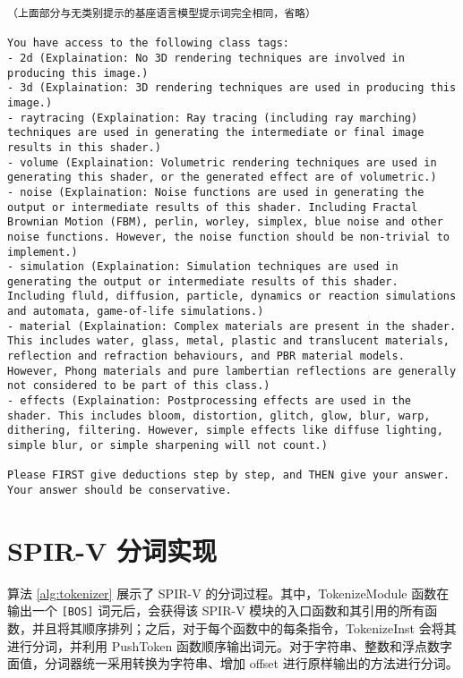     
\begin{lstlisting}[style=plaintext, caption={有详细类别提示的基座语言模型提示词}, label=lst:detailedPromptPrompt]
（上面部分与无类别提示的基座语言模型提示词完全相同，省略）

You have access to the following class tags:
- 2d (Explaination: No 3D rendering techniques are involved in producing this image.)
- 3d (Explaination: 3D rendering techniques are used in producing this image.)
- raytracing (Explaination: Ray tracing (including ray marching) techniques are used in generating the intermediate or final image results in this shader.)
- volume (Explaination: Volumetric rendering techniques are used in generating this shader, or the generated effect are of volumetric.)
- noise (Explaination: Noise functions are used in generating the output or intermediate results of this shader. Including Fractal Brownian Motion (FBM), perlin, worley, simplex, blue noise and other noise functions. However, the noise function should be non-trivial to implement.)
- simulation (Explaination: Simulation techniques are used in generating the output or intermediate results of this shader. Including fluld, diffusion, particle, dynamics or reaction simulations and automata, game-of-life simulations.)
- material (Explaination: Complex materials are present in the shader. This includes water, glass, metal, plastic and translucent materials, reflection and refraction behaviours, and PBR material models. However, Phong materials and pure lambertian reflections are generally not considered to be part of this class.)
- effects (Explaination: Postprocessing effects are used in the shader. This includes bloom, distortion, glitch, glow, blur, warp, dithering, filtering. However, simple effects like diffuse lighting, simple blur, or simple sharpening will not count.)

Please FIRST give deductions step by step, and THEN give your answer. Your answer should be conservative.
\end{lstlisting}

\section{SPIR-V 分词实现}

算法 \ref{alg:tokenizer} 展示了 SPIR-V 的分词过程。其中，TokenizeModule 函数在输出一个 \verb|[BOS]| 词元后，会获得该 SPIR-V 模块的入口函数和其引用的所有函数，并且将其顺序排列；之后，对于每个函数中的每条指令，TokenizeInst 会将其进行分词，并利用 PushToken 函数顺序输出词元。对于字符串、整数和浮点数字面值，分词器统一采用转换为字符串、增加 offset 进行原样输出的方法进行分词。

